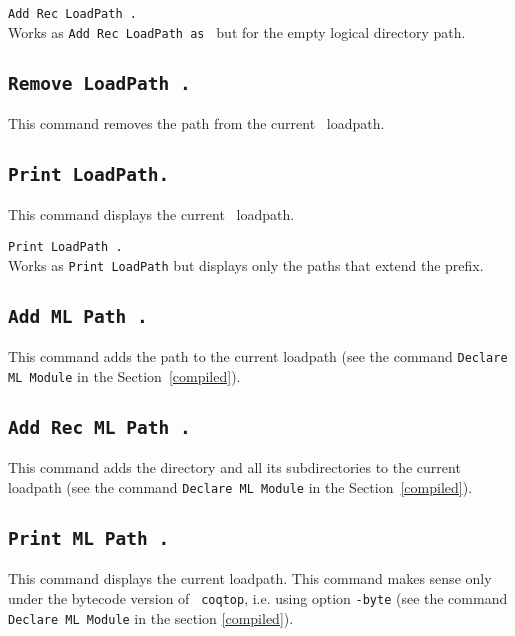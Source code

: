 \begin{Variants}
\item {\tt Add Rec LoadPath {\str}.}\\
Works as {\tt Add Rec LoadPath {\str} as {\dirpath}} but for the empty logical directory path.
\end{Variants}

\subsection[\tt Remove LoadPath {\str}.]{\tt Remove LoadPath {\str}.}
This command removes the path {\str} from the current \Coq\ loadpath.

\subsection[\tt Print LoadPath.]{\tt Print LoadPath.}
This command displays the current \Coq\ loadpath.

\begin{Variants}
\item {\tt Print LoadPath {\dirpath}.}\\
Works as {\tt Print LoadPath} but displays only the paths that extend the {\dirpath} prefix.
\end{Variants}

\subsection[\tt Add ML Path {\str}.]{\tt Add ML Path {\str}.}
This command adds the path {\str} to the current {\ocaml} loadpath (see
the command {\tt Declare ML Module} in the Section~\ref{compiled}).

\subsection[\tt Add Rec ML Path {\str}.]{\tt Add Rec ML Path {\str}.}
This command adds the directory {\str} and all its subdirectories 
to the current {\ocaml} loadpath (see
the command {\tt Declare ML Module} in the Section~\ref{compiled}).

\subsection[\tt Print ML Path {\str}.]{\tt Print ML Path {\str}.}
This command displays the current {\ocaml} loadpath.
This command makes sense only under the bytecode version of {\tt
coqtop}, i.e. using option {\tt -byte} (see the
command {\tt Declare ML Module} in the section
\ref{compiled}).

